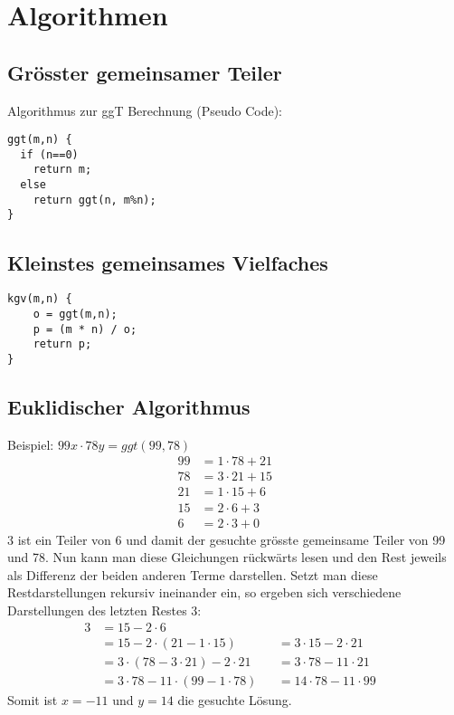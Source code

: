 \chapter{Algorithmen} %
\label{cha:algorithmen}
\section{Grösster gemeinsamer Teiler} %
\label{sec:ggt}
Algorithmus zur ggT Berechnung (Pseudo Code):
\begin{lstlisting}
ggt(m,n) {
  if (n==0)
    return m;
  else
    return ggt(n, m%n);
}
\end{lstlisting}

\section{Kleinstes gemeinsames Vielfaches} %
\label{sec:kleinstes_gemeinsames_vielfaches}
\begin{lstlisting}
kgv(m,n) {
    o = ggt(m,n);
    p = (m * n) / o;
    return p;
}
\end{lstlisting}

\section{Euklidischer Algorithmus} %
\label{sec:euklidischer_algorithmus}
Beispiel: \(99x \cdot 78y = ggt(99,78)\)
\begin{align*}
99 &= 1 \cdot 78 + 21 && \\
78 &= 3 \cdot 21 + 15 &&\\
21 &= 1 \cdot 15 + 6 &&\\
15 &= 2 \cdot 6 + 3 &&\\
 6 &= 2 \cdot 3 + 0 &&
\end{align*}
\(3\) ist ein Teiler von 6 und damit der gesuchte grösste gemeinsame Teiler von 99 und 78.
Nun kann man diese Gleichungen rückwärts lesen und den Rest jeweils als Differenz der beiden anderen Terme darstellen. Setzt man diese Restdarstellungen rekursiv ineinander ein, so ergeben sich verschiedene Darstellungen des letzten Restes 3:
\begin{align*}
	3 &= 15 - 2 \cdot 6 \\
	&= 15 - 2 \cdot (21 - 1 \cdot 15) & &= 3 \cdot 15 - 2 \cdot 21 &\\
	&= 3\cdot (78 - 3 \cdot 21) - 2 \cdot 21 & &= 3 \cdot 78 - 11 \cdot 21 &\\
	&= 3 \cdot 78 - 11 \cdot (99-1 \cdot 78) & &= 14 \cdot 78 - 11 \cdot 99 &
\end{align*}
Somit ist \(x = -11\) und \(y=14\) die gesuchte Lösung.

